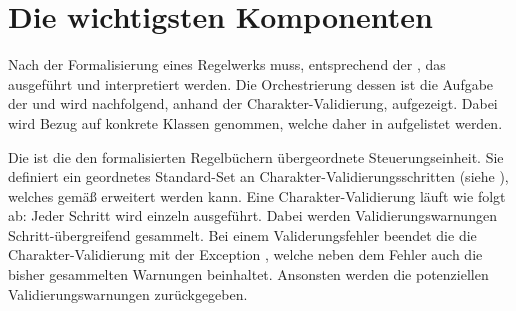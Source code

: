 \section{Die wichtigsten Komponenten}\label{sec:kern-funktionalitat}

Nach der Formalisierung eines Regelwerks muss, entsprechend der , das  ausgeführt und interpretiert werden.
Die Orchestrierung dessen ist die Aufgabe der  und wird nachfolgend, anhand der Charakter-Validierung, aufgezeigt.
Dabei wird Bezug auf konkrete Klassen genommen, welche daher in  aufgelistet werden.


Die  ist die den formalisierten Regelbüchern übergeordnete Steuerungseinheit.
Sie definiert \zB ein geordnetes Standard-Set an Charakter-Va\-li\-die\-rungs\-schritten (siehe ), welches gemäß  erweitert werden kann.
Eine Charakter-Validierung läuft wie folgt ab:
Jeder Schritt wird einzeln ausgeführt.
Dabei werden Validierungswarnungen Schritt-übergreifend gesammelt.
Bei einem Validerungsfehler beendet die  die Charakter-Validierung mit der Exception , welche neben dem Fehler auch die bisher gesammelten Warnungen beinhaltet.
Ansonsten werden die potenziellen Validierungswarnungen zurückgegeben.

